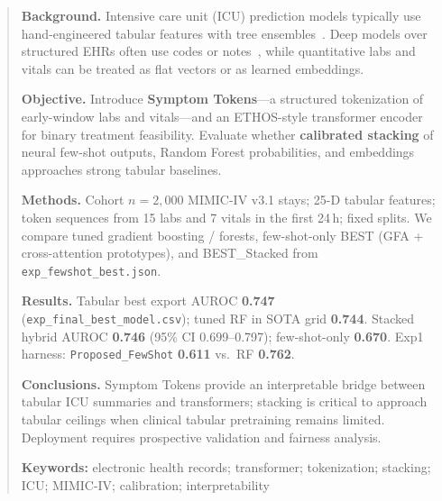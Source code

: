 \begin{abstract}
\noindent\textbf{Background.} Intensive care unit (ICU) prediction models typically use hand-engineered tabular features with tree ensembles~\citep{awad2017random,caruana2015intelligible}. Deep models over structured EHRs often use codes or notes~\citep{li2020behrt,rasmy2021med}, while quantitative labs and vitals can be treated as flat vectors or as learned embeddings.

\noindent\textbf{Objective.} Introduce \textbf{Symptom Tokens}---a structured tokenization of early-window labs and vitals---and an ETHOS-style transformer encoder~\citep{sharafi2023ethos,vaswani2017attention} for binary treatment feasibility. Evaluate whether \textbf{calibrated stacking} of neural few-shot outputs, Random Forest probabilities, and embeddings approaches strong tabular baselines.

\noindent\textbf{Methods.} Cohort $n{=}2{,}000$ MIMIC-IV v3.1 stays; 25-D tabular features; token sequences from 15 labs and 7 vitals in the first 24\,h; fixed splits. We compare tuned gradient boosting / forests, few-shot-only BEST (GFA + cross-attention prototypes), and BEST\_Stacked from \texttt{exp\_fewshot\_best.json}.

\noindent\textbf{Results.} Tabular best export AUROC \textbf{0.747} (\texttt{exp\_final\_best\_model.csv}); tuned RF in SOTA grid \textbf{0.744}. Stacked hybrid AUROC \textbf{0.746} (95\% CI 0.699--0.797); few-shot-only \textbf{0.670}. Exp1 harness: \texttt{Proposed\_FewShot} \textbf{0.611} vs.\ RF \textbf{0.762}.

\noindent\textbf{Conclusions.} Symptom Tokens provide an interpretable bridge between tabular ICU summaries and transformers; stacking is critical to approach tabular ceilings when clinical tabular pretraining remains limited. Deployment requires prospective validation and fairness analysis.

\medskip
\noindent\textbf{Keywords:} electronic health records; transformer; tokenization; stacking; ICU; MIMIC-IV; calibration; interpretability
\end{abstract}
